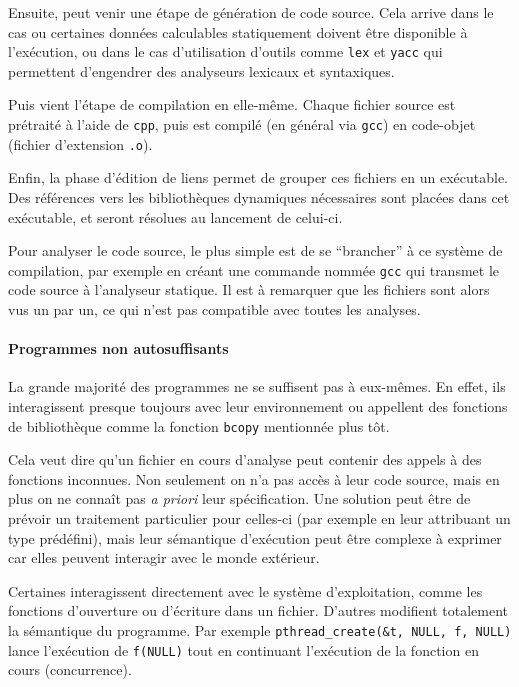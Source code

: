 Ensuite, peut venir une étape de génération de code source. Cela arrive dans le
cas ou certaines données calculables statiquement doivent être disponible à
l'exécution, ou dans le cas d'utilisation d'outils comme \texttt{lex} et
\texttt{yacc} qui permettent d'engendrer des analyseurs lexicaux et syntaxiques.

Puis vient l'étape de compilation en elle-même. Chaque fichier source est
prétraité à l'aide de \texttt{cpp}, puis est compilé (en général via
\texttt{gcc}) en code-objet (fichier d'extension \texttt{.o}).

Enfin, la phase d'édition de liens permet de grouper ces fichiers en un
exécutable. Des références vers les bibliothèques dynamiques nécessaires sont
placées dans cet exécutable, et seront résolues au lancement de celui-ci.

Pour analyser le code source, le plus simple est de se \enquote{brancher} à ce
système de compilation, par exemple en créant une commande nommée \texttt{gcc}
qui transmet le code source à l'analyseur statique. Il est à remarquer que les
fichiers sont alors vus un par un, ce qui n'est pas compatible avec toutes les
analyses.

\paragraph{Programmes non autosuffisants}

La grande majorité des programmes ne se suffisent pas à eux-mêmes. En effet, ils
interagissent presque toujours avec leur environnement ou appellent des
fonctions de bibliothèque comme la fonction \texttt{bcopy} mentionnée plus tôt.

Cela veut dire qu'un fichier en cours d'analyse peut contenir des appels à des
fonctions inconnues. Non seulement on n'a pas accès à leur code source, mais en
plus on ne connaît pas \emph{a priori} leur spécification. Une solution peut
être de prévoir un traitement particulier pour celles-ci (par exemple en leur
attribuant un type prédéfini), mais leur sémantique d'exécution peut être
complexe à exprimer car elles peuvent interagir avec le monde extérieur.

Certaines interagissent directement avec le système d'exploitation, comme les
fonctions d'ouverture ou d'écriture dans un fichier. D'autres modifient
totalement la sémantique du programme. Par exemple \texttt{pthread\_create(\&t,
NULL, f, NULL)} lance l'exécution de \texttt{f(NULL)} tout en continuant
l'exécution de la fonction en cours (concurrence).

